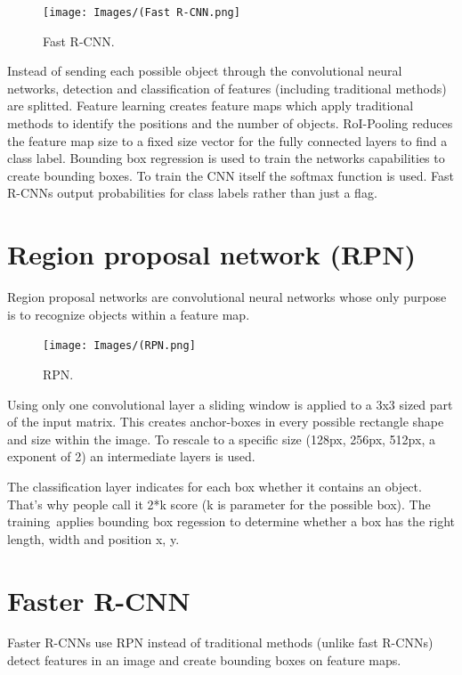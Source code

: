 \documentclass[a4paper,13pt,twoside]{book}
\begin{document}
\begin{figure}[H]
  \texttt{[image: Images/(Fast R-CNN.png]}
  \caption{Fast R-CNN.}
  \label{fig:Fast R-CNN}
\end{figure}

Instead of sending each possible object through the convolutional neural networks, detection and classification of features (including traditional methods) are splitted. Feature learning creates feature maps which apply traditional methods to identify the positions and the number of objects. RoI-Pooling reduces the feature map size to a fixed size vector for the fully connected layers to find a class label. Bounding box regression is used to train the networks capabilities to create bounding boxes. To train the CNN itself the softmax function is used. Fast R-CNNs output probabilities for class labels rather than just a flag.

\section{Region proposal network (RPN)}

Region proposal networks are convolutional neural networks whose only purpose is to recognize objects within a feature map.

\begin{figure}[H]
  \texttt{[image: Images/(RPN.png]}
  \caption{RPN.}
  \label{fig:RPN}
\end{figure}

Using only one convolutional layer a sliding window is applied to a 3x3 sized part of the input matrix. This creates anchor-boxes in every possible rectangle shape and size within the image. To rescale to a specific size (128px, 256px, 512px, a exponent of 2) an intermediate layers is used.

The classification layer indicates for each box whether it contains an object. That's why people call it 2*k score (k is parameter for the possible box). The training applies bounding box regession to determine whether a box has the right length, width and position x, y.

\section{Faster R-CNN}

Faster R-CNNs use RPN instead of traditional methods (unlike fast R-CNNs) detect features in an image and create bounding boxes on feature maps.
\end{document}
